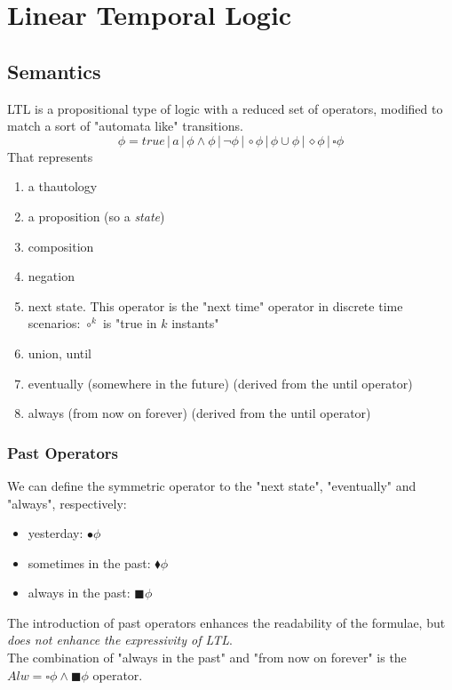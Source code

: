 \documentclass{article}
\begin{document}
		\section{Linear Temporal Logic}
			\subsection{Semantics}
				LTL is a propositional type of logic with a reduced set of operators, modified to match a sort of "automata like" transitions.
				\begin{equation}
					\phi = true \,\vert\, a \,\vert\, \phi \wedge \phi \,\vert\, \lnot \phi \,\vert\, \circ \phi \,\vert\, \phi \cup \phi \,\vert\, \diamond \phi \,\vert\, \square \phi 
				\end{equation}
				That represents
				\begin{enumerate}
					\item a thautology
					\item a proposition (so a \emph{state})
					\item composition
					\item negation
					\item next state. This operator is the "next time" operator in discrete time scenarios: $\circ^{k}$ is "true in $k$ instants"
					\item union, until
					\item eventually (somewhere in the future) (derived from the until operator)
					\item always (from now on forever) (derived from the until operator)
				\end{enumerate}
				
				\subsubsection{Past Operators}
					We can define the symmetric operator to the "next state", "eventually" and "always", respectively:
					\begin{itemize}
						\item yesterday: $\bullet \phi$
						\item sometimes in the past: $\blacklozenge \phi$
						\item always in the past: $\blacksquare \phi$
					\end{itemize}
					The introduction of past operators enhances the readability of the formulae, but \emph{does not enhance the expressivity of LTL}.\\
					The combination of "always in the past" and "from now on forever" is the $Alw = \square \phi \wedge \blacksquare \phi$ operator.
				
\end{document}
